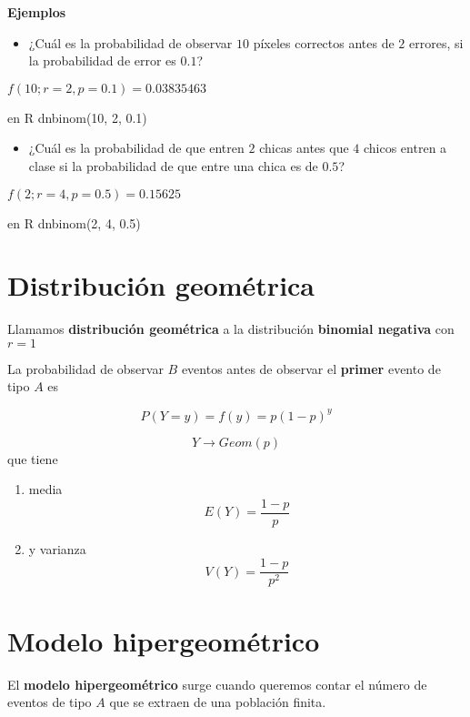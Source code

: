 \documentclass[
]{book}
\providecommand{\tightlist}{%
  \setlength{\itemsep}{0pt}\setlength{\parskip}{0pt}}
\begin{document}
\textbf{Ejemplos}

\begin{itemize}
\tightlist
\item
  ¿Cuál es la probabilidad de observar \(10\) píxeles correctos antes de \(2\) errores, si la probabilidad de error es \(0.1\)?
\end{itemize}

\(f(10; r=2, p=0.1)=0.03835463\)

en R dnbinom(10, 2, 0.1)

\begin{itemize}
\tightlist
\item
  ¿Cuál es la probabilidad de que entren \(2\) chicas antes que \(4\) chicos entren a clase si la probabilidad de que entre una chica es de \(0.5\)?
\end{itemize}

\(f(2; r=4, p=0.5)=0.15625\)

en R dnbinom(2, 4, 0.5)

\hypertarget{distribuciuxf3n-geomuxe9trica}{%
\section{Distribución geométrica}\label{distribuciuxf3n-geomuxe9trica}}

Llamamos \textbf{distribución geométrica} a la distribución \textbf{binomial negativa} con \(r=1\)

La probabilidad de observar \(B\) eventos antes de observar el \textbf{primer} evento de tipo \(A\) es

\[P(Y=y)=f(y)= p(1-p)^y\]

\[Y\rightarrow Geom(p)\]
que tiene

\begin{enumerate}
\def\labelenumi{\arabic{enumi})}
\item
  media \[E(Y)= \frac{1-p}{p}\]
\item
  y varianza \[V(Y)= \frac{1-p}{p^2}\]
\end{enumerate}

\hypertarget{modelo-hipergeomuxe9trico}{%
\section{Modelo hipergeométrico}\label{modelo-hipergeomuxe9trico}}

El \textbf{modelo hipergeométrico} surge cuando queremos contar el número de eventos de tipo \(A\) que se extraen de una población finita.
\end{document}
